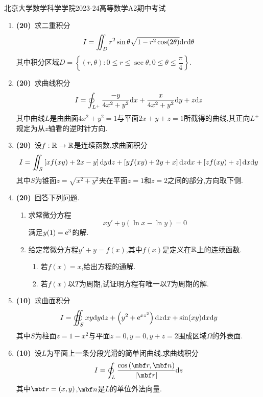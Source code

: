 \documentclass{ctexart}
\begin{document}
\pagestyle{empty}
\begin{center}\Large
    北京大学数学科学学院2023-24高等数学A2期中考试
\end{center}
\begin{enumerate}[leftmargin=*,label=\textbf{\arabic*.}]
    \item \textbf{(20)}\ 求二重积分
        \[I=\iint_{D}r^2\sin\theta\sqrt{1-r^2\cos(2\theta)}\mathrm{d} r\mathrm{d}\theta\]
        其中积分区域$D=\left\{(r,\theta):0\leqslant r\leqslant\sec\theta,0\leqslant\theta\leqslant\dfrac\pi4\right\}$.

    \item \textbf{(20)}\ 求曲线积分
        \[I=\oint_{L^+}\dfrac{-y}{4x^2+y^2}\mathrm{d} x+\dfrac{x}{4x^2+y^2}\mathrm{d} y+z\mathrm{d} z\]
        其中曲线$L$是由曲面$4x^2+y^2=1$与平面$2x+y+z=1$所截得的曲线,其正向$L^+$规定为从$z$轴看的逆时针方向.

    \item \textbf{(20)}\ 设$f:\mathbb{R}\to\mathbb{R}$是连续函数,求曲面积分
        \[I=\iint_S\left[xf(xy)+2x-y\right]\mathrm{d} y\mathrm{d} z+\left[yf(xy)+2y+x\right]\mathrm{d} z\mathrm{d} x+\left[zf(xy)+z\right]\mathrm{d} x\mathrm{d} y\]
        其中$S$为锥面$z=\sqrt{x^2+y^2}$夹在平面$z=1$和$z=2$之间的部分,方向取下侧.

    \item \textbf{(20)}\ 回答下列问题.
        \begin{enumerate}[label=\tbf{(\arabic*)}]
            \item 求常微分方程
                \[xy'+y\left(\ln x-\ln y\right)=0\]
                满足$y(1)=\mathrm{e}^3$的解.
            \item 给定常微分方程$y'+y=f(x)$,其中$f(x)$是定义在$\mathbb{R}$上的连续函数.
                \begin{enumerate}[label=\tbf{(\alph*)}]
                    \item 若$f(x)=x$,给出方程的通解.
                    \item 若$f(x)$以$T$为周期,试证明方程有唯一以$T$为周期的解.
                \end{enumerate}
        \end{enumerate}
        
    \item \textbf{(10)}\ 求曲面积分
        \[I=\oiint_{S}xy\mathrm{d} y\mathrm{d} z+\left(y^2+\mathrm{e}^{xz^2}\right)\mathrm{d} z\mathrm{d} x+\sin(xy)\mathrm{d} x\mathrm{d} y\]
        其中$S$为柱面$z=1-x^2$与平面$z=0,y=0,y+z=2$围成区域$\Omega$的外表面.

    \item \textbf{(10)}\ 设$L$为平面上一条分段光滑的简单闭曲线,求曲线积分
        \[I=\oint_{L}\dfrac{\cos\left(\mbf r,\mbf n\right)}{\left|\mbf r\right|}\di s\]
        其中$\mbf r=(x,y)$,$\mbf n$是$L$的单位外法向量.

\end{enumerate}
\end{document}
